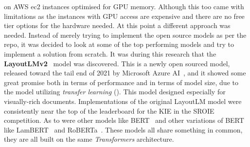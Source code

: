 on AWS ec2 instances optimised for GPU memory. Although this too came with limitations as the instances with GPU access are expensive and there are no
free tier options for the hardware needed. At this point a different approach was needed.
\bigbreak
Instead of merely trying to implement the open source models as per the repo, it was decided to look at some of the top performing models and try to implement
a solution from scratch. It was during this research that the \textbf{LayoutLMv2}~\autocite{xuLayoutLMv2MultimodalPretraining2022} model was discovered. This is a newly open
sourced model, released toward the tail end of 2021 by Microsoft Azure AI~\autocite{ArtificialIntelligenceResearch}, and it showed some great promise both in
terms of performance and in terms of model size, due to the model utilizing \emph{transfer learning} (). This model designed especially
for visually-rich documents.
Implementations of the original LayoutLM model were consistently near the top of the leaderboard for the KIE in the SROIE competition. As to were
other models like BERT~\autocite{BERT} and other variations of BERT like LamBERT~\autocite{LAMBERT2022} and RoBERTa~\autocite{RoBERTa}.
These models all share something in common, they are all built on the same \emph{Transformers} architecture.
\bigbreak
